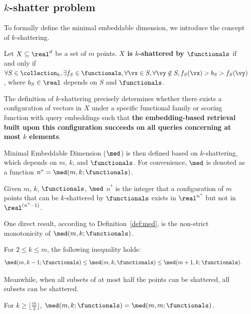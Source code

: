 \subsection{$k$-shatter problem}
To formally define the minimal embeddable dimension, we introduce the concept of $k$-shattering.
\begin{definition}[$k$-shattering]
    Let $X\subseteq \real^d$ be a set of $m$ points. \textbf{$X$ is $k$-shattered by $\functionals$} if and only if  $\forall S\in \collection_k,\exists f_S\in \functionals,\forall \vx \in S,\forall \vy\notin S, f_S(\vx) > b_S > f_S(\vy)$, where $b_S\in \real$ depends on $S$ and $\functionals$.
\end{definition} 

\begin{remark}
    The definition of $k$-shattering precisely determines whether there exists a configuration of vectors in $X$ under a specific functional family or scoring function with query embeddings such that \textbf{the embedding-based retrieval built upon this configuration succeeds on all queries concerning at most $k$ elements}.
\end{remark}

Minimal Embeddable Dimension ($\med$) is then defined based on $k$-shattering, which depends on $m$, $k$, and $\functionals$. For convenience, $\med$ is denoted as a function $n^*=\med(m, k; \functionals)$.
\begin{definition}\label{def:med}
    Given $m$, $k$, $\functionals$, $\med$ $n^*$ is the integer that a configuration of $m$ points that can be $k$-shattered by $\functionals$ exists in $\real^{n^*}$ but not in $\real^{(n^*-1)}$.
\end{definition}

One direct result, according to Definition~\ref{def:med}, is the non-strict monotonicity of $\med(m, k; \functionals)$.
\begin{proposition}\label{prop:monotonic}
For $2\leq k\leq m$, the following inequality holds:
\begin{align*}
    \med(m, k-1;\functionals) &\leq \med(m, k; \functionals) \leq \med(m+1, k; \functionals).
\end{align*}
\end{proposition}

Meanwhile, when all subsets of at most half the points can be shattered, all subsets can be shattered.
\begin{proposition}\label{prop:half-shatter}
    For $k\geq \lfloor \frac{m}{2} \rfloor$, $\med(m, k;\functionals) = \med(m, m;\functionals)$.
\end{proposition}


